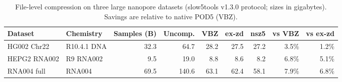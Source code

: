 \begin{table}[t]
\centering
\caption{File-level compression on three large nanopore datasets (slow5tools v1.3.0 protocol; sizes in gigabytes). Savings are relative to native POD5 (VBZ).}
\label{tab:large-bench}
\small
\begin{tabular}{llrrrrrrr}
\toprule
Dataset & Chemistry & Samples (B) & Uncomp. & VBZ & ex-zd & nsz5 & vs VBZ & vs ex-zd \\
\midrule
HG002 Chr22 & R10.4.1 DNA & 32.3 & 64.7 & 28.2 & 27.5 & 27.2 & 3.5\% & 1.2\% \\
HEPG2 RNA002 & R9 RNA002 & 9.5 & 19.0 & 8.8 & 8.6 & 8.2 & 6.8\% & 5.1\% \\
RNA004 full & RNA004 & 69.5 & 140.6 & 63.1 & 62.4 & 58.1 & 7.9\% & 6.8\% \\
\bottomrule
\end{tabular}
\end{table}
